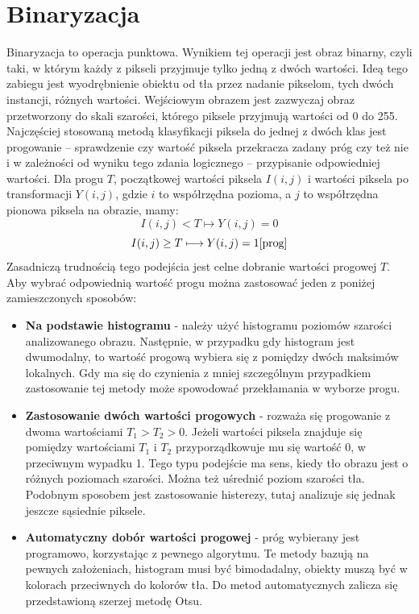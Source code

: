 \documentclass[eng,oneside]{mgr}
\begin{document}
\section{Binaryzacja}
Binaryzacja to operacja punktowa. Wynikiem tej operacji jest obraz binarny, czyli taki, w którym każdy z pikseli przyjmuje tylko jedną z dwóch wartości. Ideą tego zabiegu jest wyodrębnienie obiektu od tła przez nadanie pikselom, tych dwóch instancji, różnych wartości. Wejściowym obrazem jest zazwyczaj obraz przetworzony do skali szarości, którego piksele przyjmują wartości od 0 do 255. Najczęściej stosowaną metodą klasyfikacji piksela do jednej z dwóch klas jest progowanie – sprawdzenie czy wartość piksela przekracza zadany próg czy też nie i w zależności od wyniku tego zdania logicznego – przypisanie odpowiedniej wartości. Dla progu $T$, początkowej wartości piksela $I(i,j)$ i wartości piksela po transformacji $Y(i,j)$, gdzie $i$ to współrzędna pozioma, a $j$ to współrzędna pionowa piksela na obrazie, mamy:
\begin{equation}
I(i,j) < T \longmapsto Y(i,j) = 0 
\end{equation}
\begin{equation}
I(i,j) \geq T \longmapsto Y(i,j) = 1 \cite{prog}
\end{equation}
Zasadniczą trudnością tego podejścia jest celne dobranie wartości progowej $T$. Aby wybrać odpowiednią wartość progu można zastosować jeden z poniżej zamieszczonych sposobów:
\begin{itemize}
\item \textbf{Na podstawie histogramu} - należy użyć histogramu poziomów szarości analizowanego obrazu. Następnie, w przypadku gdy histogram jest dwumodalny, to wartość progową wybiera się z pomiędzy dwóch maksimów lokalnych. Gdy ma się do czynienia z mniej szczególnym przypadkiem zastosowanie tej metody może spowodować przekłamania w wyborze progu\cite{histogram}.
\item \textbf{Zastosowanie dwóch wartości progowych} - rozważa się progowanie z dwoma wartościami $T_1 > T_2 > 0$. Jeżeli wartości piksela znajduje się pomiędzy wartościami $T_1$ i $T_2$ przyporządkowuje mu się wartość 0, w przeciwnym wypadku 1. Tego typu podejście ma sens, kiedy tło obrazu jest o różnych poziomach szarości. Można też uśrednić poziom szarości tła. Podobnym sposobem jest zastosowanie histerezy, tutaj analizuje się jednak jeszcze sąsiednie piksele\cite{dwaprogi}. 
\item \textbf{Automatyczny dobór wartości progowej} - próg wybierany jest programowo, korzystając z pewnego algorytmu. Te metody bazują na pewnych założeniach, histogram musi być bimodadalny, obiekty muszą być w kolorach przeciwnych do kolorów tła. Do metod automatycznych zalicza się przedstawioną szerzej metodę Otsu\cite{auto}.
\end{itemize}
\end{document}
